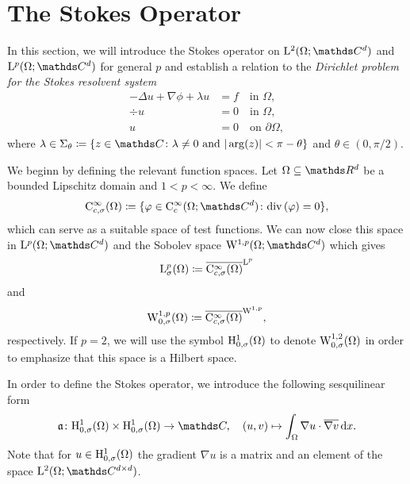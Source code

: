 \section{The Stokes Operator}
\label{sec:stokesOperator}

In this section, we will introduce the Stokes operator on $\Ell^2(\Omega; \C^d)$ and $\Ell^p(\Omega; \C^d)$ for general $p$ and establish a relation to the \emph{Dirichlet problem for the Stokes resolvent system}
\begin{align}
  -\Delta u + \nabla \phi + \lambda u &= f  \quad\text{in } \Omega, \nonumber\\
  \div u &= 0 \quad\text{in } \Omega, \label{eq:stokesResolventSystem} \\
  u &= 0 \quad\text{on } \partial\Omega, \nonumber
\end{align}
where $\lambda \in \Sigma_\theta \coloneqq \{ z \in \C \colon \lambda \neq 0 \text{ and } |\arg(z) | < \pi - \theta \}$ and $\theta \in (0, \pi/2)$.

We beginn by defining the relevant function spaces.
Let $\Omega \subseteq \R^d$ be a bounded Lipschitz domain and $1 < p < \infty$. 
We define
\begin{align*}
  \CC_{c, \sigma}^\infty(\Omega) \coloneqq \{ \varphi \in \CC_c^\infty(\Omega; \C^d) \colon \div(\varphi) = 0 \},
\end{align*}
which can serve as a suitable space of test functions.
We can now close this space in $\Ell^p(\Omega; \C^d)$ and the Sobolev space $\WW^{1,p}(\Omega; \C^d)$ which gives
\begin{align*}
  \mathrm{L}_\sigma^p(\Omega) \coloneqq \overline{\mathrm{C}_{c,\sigma}^\infty(\Omega)}^{\mathrm{L}^p}
\end{align*}
and
\begin{align*}
  \mathrm{W}_{0,\sigma}^{1,p}(\Omega) \coloneqq \overline{\mathrm{C}_{c,\sigma}^\infty(\Omega)}^{\mathrm{W}^{1,p}},
\end{align*}
respectively.
If $p = 2$, we will use the symbol $\mathrm{H}_{0,\sigma}^1(\Omega)$ to denote $\mathrm{W}_{0,\sigma}^{1,2}(\Omega)$ in order to emphasize that this space is a Hilbert space.

In order to define the Stokes operator, we introduce the following sesquilinear form
\begin{align*}
  \aform \colon \HH_{0,\sigma}^1(\Omega) \times \HH_{0,\sigma}^1(\Omega) \to \C, \quad (u,v) \mapsto \int_\Omega \nabla u \cdot \overline{\nabla v} \d x.
\end{align*}
Note that for $u \in \mathrm{H}_{0,\sigma}^1(\Omega)$ the gradient $\nabla u$ is a matrix and an element of the space $\Ell^2(\Omega; \C^{d \times d})$.


